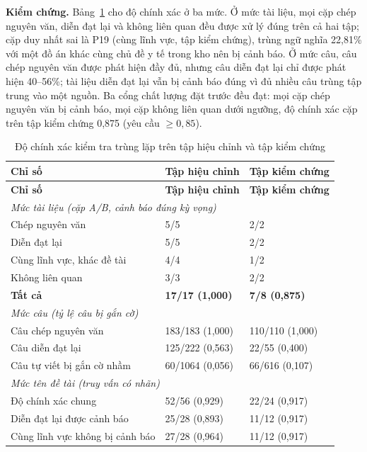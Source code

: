 \documentclass[../main.tex]{subfiles}
\begin{document}
\textbf{Kiểm chứng.} Bảng~\ref{tab:c4-kiem-chung} cho độ chính xác ở ba mức. Ở mức tài liệu, mọi cặp chép nguyên văn, diễn đạt lại và không liên quan đều được xử lý đúng trên cả hai tập; cặp duy nhất sai là P19 (cùng lĩnh vực, tập kiểm chứng), trùng ngữ nghĩa 22,81\% với một đồ án khác cùng chủ đề y tế trong kho nên bị cảnh báo. Ở mức câu, câu chép nguyên văn được phát hiện đầy đủ, nhưng câu diễn đạt lại chỉ được phát hiện 40--56\%; tài liệu diễn đạt lại vẫn bị cảnh báo đúng vì đủ nhiều câu trùng tập trung vào một nguồn. Ba cổng chất lượng đặt trước đều đạt: mọi cặp chép nguyên văn bị cảnh báo, mọi cặp không liên quan dưới ngưỡng, độ chính xác cặp trên tập kiểm chứng 0,875 (yêu cầu $\geq 0{,}85$).

{\renewcommand{\arraystretch}{1.15}
\begin{longtable}{|p{6.8cm}|p{3.8cm}|p{3.8cm}|}
\caption{Độ chính xác kiểm tra trùng lặp trên tập hiệu chỉnh và tập kiểm chứng}\label{tab:c4-kiem-chung}\\
\hline
\textbf{Chỉ số} & \textbf{Tập hiệu chỉnh} & \textbf{Tập kiểm chứng} \\
\hline
\endfirsthead
\hline
\textbf{Chỉ số} & \textbf{Tập hiệu chỉnh} & \textbf{Tập kiểm chứng} \\
\hline
\endhead
\multicolumn{3}{|l|}{\textit{Mức tài liệu (cặp A/B, cảnh báo đúng kỳ vọng)}} \\
\hline
Chép nguyên văn & 5/5 & 2/2 \\
\hline
Diễn đạt lại & 5/5 & 2/2 \\
\hline
Cùng lĩnh vực, khác đề tài & 4/4 & 1/2 \\
\hline
Không liên quan & 3/3 & 2/2 \\
\hline
\textbf{Tất cả} & \textbf{17/17 (1,000)} & \textbf{7/8 (0,875)} \\
\hline
\multicolumn{3}{|l|}{\textit{Mức câu (tỷ lệ câu bị gắn cờ)}} \\
\hline
Câu chép nguyên văn & 183/183 (1,000) & 110/110 (1,000) \\
\hline
Câu diễn đạt lại & 125/222 (0,563) & 22/55 (0,400) \\
\hline
Câu tự viết bị gắn cờ nhầm & 60/1064 (0,056) & 66/616 (0,107) \\
\hline
\multicolumn{3}{|l|}{\textit{Mức tên đề tài (truy vấn có nhãn)}} \\
\hline
Độ chính xác chung & 52/56 (0,929) & 22/24 (0,917) \\
\hline
Diễn đạt lại được cảnh báo & 25/28 (0,893) & 11/12 (0,917) \\
\hline
Cùng lĩnh vực không bị cảnh báo & 27/28 (0,964) & 11/12 (0,917) \\
\hline
\end{longtable}
}
\end{document}
